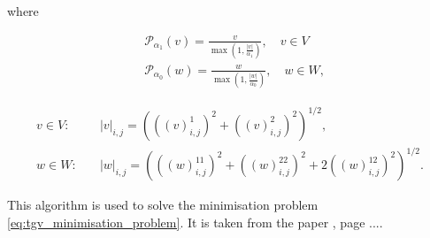 \documentclass{article}
\begin{document}
where 

\begin{equation}
    \begin{aligned}
    & \mathcal{P}_{\alpha_1}(v) = \frac{v}{\max \left(1, \frac{|v|}{\alpha_1}\right)}, \quad v \in V \\
    & \mathcal{P}_{\alpha_0}(w) = \frac{w}{\max \left(1, \frac{|w|}{\alpha_0}\right)}, \quad w \in W,
    \end{aligned}
\end{equation}



\begin{equation}
    \begin{aligned}
    v \in V : \quad &|v|_{i,j} = \left( \left( (v)_{i,j}^1 \right)^2 + \left( (v)_{i,j}^2 \right)^2 \right)^{1/2}, \\
    w \in W : \quad &|w|_{i,j} = \left( \left( (w)_{i,j}^{11} \right)^2 + \left( (w)_{i,j}^{22} \right)^2 + 2 \left( (w)_{i,j}^{12} \right)^2 \right)^{1/2}.
    \end{aligned}
\end{equation}


This algorithm is used to solve the minimisation problem \ref{eq:tgv_minimisation_problem}.
It is taken from the paper \cite{recovering_piecewise_smooth_multichannel_images}, page ....



\printbibliography
\end{document}
